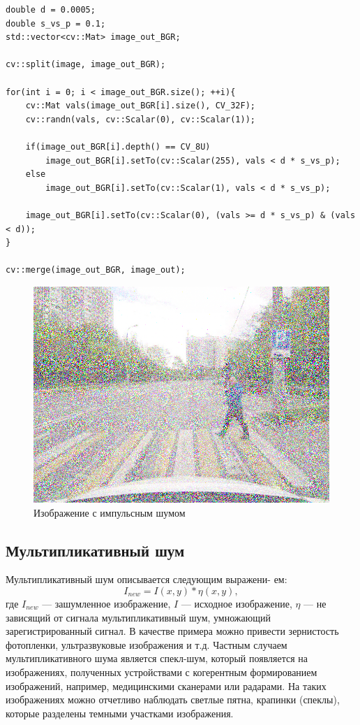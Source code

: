 \begin{lstlisting}[style=cpp_white, caption={Исходный код для применения импульсного шума к изображению}]
double d = 0.0005;
double s_vs_p = 0.1;
std::vector<cv::Mat> image_out_BGR;

cv::split(image, image_out_BGR);

for(int i = 0; i < image_out_BGR.size(); ++i){
    cv::Mat vals(image_out_BGR[i].size(), CV_32F);
    cv::randn(vals, cv::Scalar(0), cv::Scalar(1));

    if(image_out_BGR[i].depth() == CV_8U)
        image_out_BGR[i].setTo(cv::Scalar(255), vals < d * s_vs_p);
    else
        image_out_BGR[i].setTo(cv::Scalar(1), vals < d * s_vs_p);

    image_out_BGR[i].setTo(cv::Scalar(0), (vals >= d * s_vs_p) & (vals < d));
}

cv::merge(image_out_BGR, image_out);
\end{lstlisting}

\begin{figure}[ht]
    \includegraphics[width=\textwidth]{../outputs/image_impulse_noise.png}
    \caption{Изображение с импульсным шумом}
    \label{fig:impulse_image}
\end{figure}

\pagebreak

\subsection{Мультипликативный шум}

Мультипликативный шум описывается следующим выражени-
ем:
\begin{equation}
    I_{new} = I(x, y) * \eta(x, y), 
\label{eq:complex_func}
\end{equation}
где $I_{new}$ — зашумленное изображение, $I$ — исходное изображение,
$\eta$ — не зависящий от сигнала мультипликативный шум, умножающий зарегистрированный сигнал. 
В качестве примера можно привести зернистость фотопленки, ультразвуковые изображения и т.д.
Частным случаем мультипликативного шума является спекл-шум,
который появляется на изображениях, полученных устройствами
с когерентным формированием изображений, например, медицинскими сканерами или радарами.
На таких изображениях можно отчетливо наблюдать светлые пятна, крапинки (спеклы), которые
разделены темными участками изображения.
  
